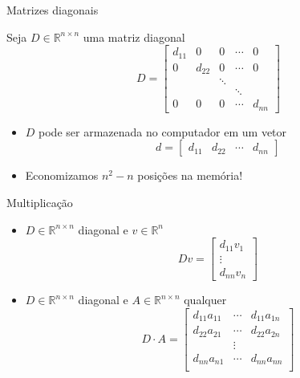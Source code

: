 \documentclass[]{beamer}
\newcommand{\R}{\mathbb{R}}
\begin{document}
\begin{frame}{Matrizes diagonais}

  Seja $D \in \R^{n \times n}$ uma matriz diagonal
  \[
  D =
  \begin{bmatrix}
    d_{11} & 0 & 0 & \cdots & 0 \\
    0 & d_{22} & 0 & \cdots & 0 \\
      & & \ddots & & \\
      & & & \ddots & \\
    0 & 0 & 0 & \cdots & d_{nn}
  \end{bmatrix}
  \]

  \begin{itemize}
  \item $D$ pode ser armazenada no computador em um vetor
    \[
    d =
    \begin{bmatrix}
      d_{11} & d_{22} & \cdots & d_{nn}
    \end{bmatrix}
    \]

  \item Economizamos $n^2 - n$ posições na memória!
  \end{itemize}
  
\end{frame}

\begin{frame}{Multiplicação}
  
  \begin{itemize}
  \item $D \in \R^{n \times n}$ diagonal e $v \in \R^n$
    \[
    D v =
    \begin{bmatrix}
      d_{11} v_1 \\
      \vdots \\
      d_{nn} v_n
    \end{bmatrix}
    \]

  \item $D \in \R^{n \times n}$ diagonal e $A \in \R^{n \times n}$
    qualquer
    \[
    D \cdot A =
    \begin{bmatrix}
      d_{11} a_{11} & \cdots & d_{11} a_{1n} \\
      d_{22} a_{21} & \cdots & d_{22} a_{2n} \\
      & \vdots & \\
      d_{nn} a_{n1} & \cdots & d_{nn} a_{nn} \\      
    \end{bmatrix}
    \]
  \end{itemize}

\end{frame}
\end{document}
